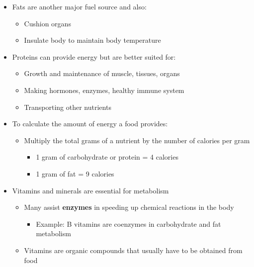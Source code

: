 \documentclass[12pt]{article}
\begin{document}
\begin{itemize}
                \item Fats are another major fuel source and also:
                    \begin{itemize}
                        \item Cushion organs
                        \item Insulate body to maintain body temperature
                    \end{itemize}
                \item Proteins can provide energy but are better suited for:
                    \begin{itemize}
                        \item Growth and maintenance of muscle, tissues, organs
                        \item Making hormones, enzymes, healthy immune system
                        \item Transporting other nutrients
                    \end{itemize}
                \item To calculate the amount of energy a food provides:
                    \begin{itemize}
                        \item Multiply the total grams of a nutrient by the number of calories per gram
                            \begin{itemize}
                                \item 1 gram of carbohydrate or protein = 4 calories
                                \item 1 gram of fat = 9 calories
                            \end{itemize}
                    \end{itemize}
                \item Vitamins and minerals are essential for metabolism
                    \begin{itemize}
                        \item Many assist \textbf{enzymes} in speeding up chemical reactions in the body
                            \begin{itemize}
                                \item Example: B vitamins are coenzymes in carbohydrate and fat metabolism
                            \end{itemize}
                        \item Vitamins are organic compounds that usually have to be obtained from food

\end{itemize}
\end{itemize}
\end{document}
